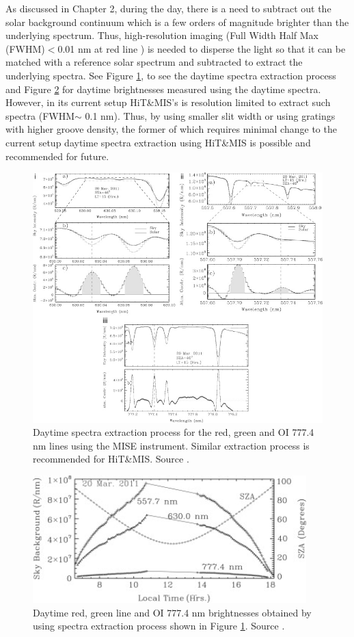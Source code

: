 \documentclass[crop=false,class=mitthesis,oneside,font=12pt]{standalone}
\begin{document}
As discussed in Chapter 2, during the day, there is a need to subtract out the solar background continuum which is a few orders of magnitude brighter than the underlying spectrum. Thus, high-resolution imaging (Full Width Half Max (FWHM)$<$0.01 nm at red line \citep{hitmis}) is needed to disperse the light so that it can be matched with a reference solar spectrum and subtracted to extract the underlying spectra. See Figure \ref{fig:mise}, to see the daytime spectra extraction process and Figure \ref{fig:mise_b} for daytime brightnesses measured using the daytime spectra. However, in its current setup HiT\&MIS's is resolution limited to extract such spectra (FWHM$\sim$ 0.1 nm). Thus, by using smaller slit width or using gratings with higher groove density, the former of which requires minimal change to the current setup daytime spectra extraction using HiT\&MIS is possible and recommended for future. 
\begin{figure}[H]
	\centering\includegraphics[width=28pc]{mise_day.jpg}
	\caption{Daytime spectra extraction process for the red, green and OI 777.4 nm lines using the MISE instrument. Similar extraction process is recommended for HiT\&MIS. Source \cite{mise}.}
	\label{fig:mise}
\end{figure}
\begin{figure}[H]
	\centering\includegraphics[width=25pc]{mise_brg.jpg}
	\caption{Daytime red, green line and OI 777.4 nm brightnesses obtained by using spectra extraction process shown in Figure \ref{fig:mise}. Source \cite{mise}.}
	\label{fig:mise_b}
\end{figure}
\end{document}
